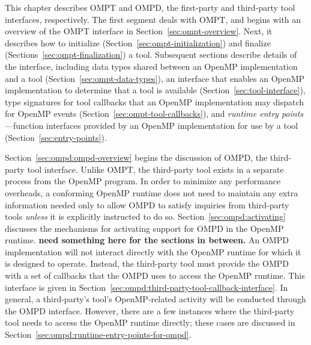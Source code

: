 

This chapter describes OMPT and OMPD, the first-party and third-party
tool interfaces, respectively.
The first segment deals with OMPT, and begins with an overview
of the OMPT interface in Section~\ref{sec:ompt-overview}.
Next, it describes how to initialize (Section~\ref{sec:ompt-initialization})
and finalize (Sections~\ref{sec:ompt-finalization}) a tool.
Subsequent sections describe details of the interface, including
data types shared between an OpenMP implementation and a tool
(Section~\ref{sec:ompt-data-types}), 
an interface that enables an OpenMP implementation to determine that a
tool is available (Section~\ref{sec:tool-interface}),
type signatures for tool callbacks 
that an OpenMP implementation may dispatch for OpenMP events
(Section~\ref{sec:ompt-tool-callbacks}), and 
\emph{runtime entry points}---function interfaces
provided by an OpenMP implementation for use by a tool
(Section~\ref{sec:entry-points}). 

Section~\ref{sec:ompd:ompd-overview} begins the discussion of
OMPD, the third-party tool interface.
Unlike OMPT, the third-party tool exists in a separate process from
the OpenMP program.
In order to minimize any performance overheads, a conforming OpenMP
runtime does not need to maintain any extra information needed only
to allow OMPD to satisfy inquiries from third-party tools
\emph{unless} it is explicitly instructed to do so.
Section~\ref{sec:ompd:activating} discusses the mechanisms for
activating support for OMPD in the OpenMP runtime.
{\bf need something here for the sections in between.}
An OMPD implementation will not interact directly with the OpenMP
runtime for which it is designed to operate.
Instead, the third-party tool must provide the OMPD with a set of
callbacks that the OMPD uses to access the OpenMP runtime.
This interface is given in
Section~\ref{sec:ompd:third-party-tool-callback-interface}.
In general, a third-party's tool's OpenMP-related activity will be
conducted through the OMPD interface.
However, there are a few instances where the third-party tool needs
to access the OpenMP runtime directly;
these cases are discussed in
Section~\ref{sec:ompd:runtime-entry-points-for-ompd}.








